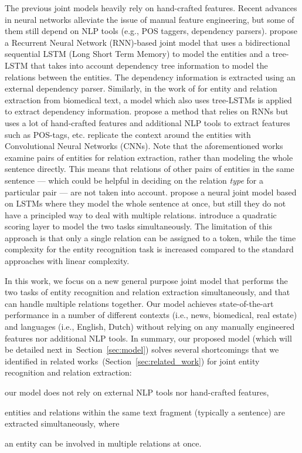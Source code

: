 \documentclass[review]{elsarticle}
\newcommand{\eg}{e.g., }
\newcommand{\ie}{i.e., }
\newcommand{\secref}[1]{Section~\ref{#1}}
\begin{document}
The previous joint models heavily rely on hand-crafted features. Recent advances in neural networks alleviate the issue of manual feature engineering, but some of them still depend on NLP tools (\eg POS taggers, dependency parsers). 
\cite{miwa:16} propose a Recurrent Neural Network (RNN)-based joint model that uses a bidirectional sequential LSTM (Long Short Term Memory) to model the entities and a tree-LSTM that takes into account dependency tree information to model the relations between the entities. The dependency information is extracted using an external dependency parser.
Similarly, in the work of \cite{li:17} for entity and relation extraction from biomedical text, a model which also uses tree-LSTMs is applied to extract dependency information.
\cite{gupta:16} propose a method that relies on RNNs but uses a lot of hand-crafted features and additional NLP tools to extract features such as POS-tags, etc.
\cite{heike:17} replicate the context around the entities with Convolutional Neural Networks (CNNs).
Note that the aforementioned works examine pairs of entities for relation extraction, rather than modeling the whole sentence directly. This means that relations of other pairs of entities in the same sentence --- which could be helpful in deciding on the relation \emph{type} for a particular pair --- are not taken into account. 
\cite{katiyar:17} propose a neural joint model based on LSTMs where they model the whole sentence at once, but still they do not have a principled way to deal with multiple relations.
\cite{bekoulis:18} introduce a quadratic scoring layer to model the two tasks simultaneously. The limitation of this approach is that only a single relation can be assigned to a token, while the time complexity for the entity recognition task is increased compared to the standard approaches with linear complexity.

In this work, we focus on a new general purpose joint model that performs the two tasks of entity recognition and relation extraction simultaneously, and that can handle multiple relations together. Our model achieves state-of-the-art performance in a number of different contexts (\ie news, biomedical, real estate) and languages (\ie English, Dutch) without relying on any manually engineered features nor additional NLP tools. 
In summary, our proposed model (which will be detailed next in~\secref{sec:model}) solves several shortcomings that we identified in related works~(\secref{sec:related_work}) for joint entity recognition and relation extraction:
\begin{enumerate*}[label=(\roman*)]
\item our model does not rely on external NLP tools nor hand-crafted features,
\item entities and relations within the same text fragment (typically a sentence) are extracted simultaneously, where
\item an entity can be involved in multiple relations at once.
\end{enumerate*}
\end{document}
